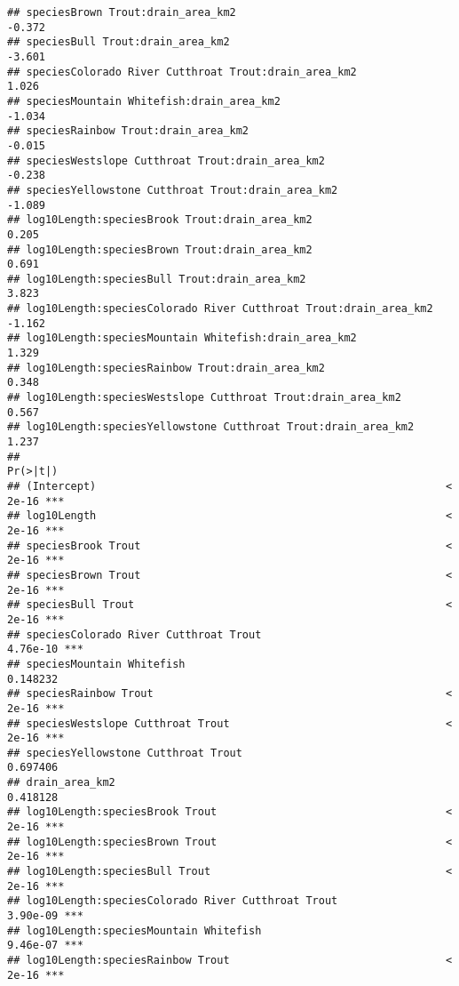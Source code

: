\documentclass[
  landscape]{article}
\begin{document}
\begin{verbatim}
## speciesBrown Trout:drain_area_km2                                  -0.372
## speciesBull Trout:drain_area_km2                                   -3.601
## speciesColorado River Cutthroat Trout:drain_area_km2                1.026
## speciesMountain Whitefish:drain_area_km2                           -1.034
## speciesRainbow Trout:drain_area_km2                                -0.015
## speciesWestslope Cutthroat Trout:drain_area_km2                    -0.238
## speciesYellowstone Cutthroat Trout:drain_area_km2                  -1.089
## log10Length:speciesBrook Trout:drain_area_km2                       0.205
## log10Length:speciesBrown Trout:drain_area_km2                       0.691
## log10Length:speciesBull Trout:drain_area_km2                        3.823
## log10Length:speciesColorado River Cutthroat Trout:drain_area_km2   -1.162
## log10Length:speciesMountain Whitefish:drain_area_km2                1.329
## log10Length:speciesRainbow Trout:drain_area_km2                     0.348
## log10Length:speciesWestslope Cutthroat Trout:drain_area_km2         0.567
## log10Length:speciesYellowstone Cutthroat Trout:drain_area_km2       1.237
##                                                                  Pr(>|t|)    
## (Intercept)                                                       < 2e-16 ***
## log10Length                                                       < 2e-16 ***
## speciesBrook Trout                                                < 2e-16 ***
## speciesBrown Trout                                                < 2e-16 ***
## speciesBull Trout                                                 < 2e-16 ***
## speciesColorado River Cutthroat Trout                            4.76e-10 ***
## speciesMountain Whitefish                                        0.148232    
## speciesRainbow Trout                                              < 2e-16 ***
## speciesWestslope Cutthroat Trout                                  < 2e-16 ***
## speciesYellowstone Cutthroat Trout                               0.697406    
## drain_area_km2                                                   0.418128    
## log10Length:speciesBrook Trout                                    < 2e-16 ***
## log10Length:speciesBrown Trout                                    < 2e-16 ***
## log10Length:speciesBull Trout                                     < 2e-16 ***
## log10Length:speciesColorado River Cutthroat Trout                3.90e-09 ***
## log10Length:speciesMountain Whitefish                            9.46e-07 ***
## log10Length:speciesRainbow Trout                                  < 2e-16 ***

\end{verbatim}
\end{document}
